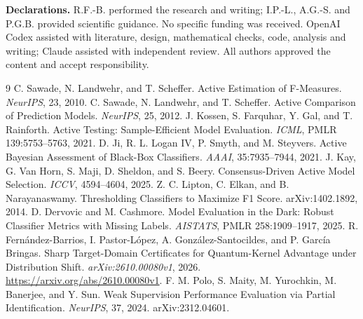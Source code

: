 \documentclass[a4paper]{esannV2}
\begin{document}
\noindent\textbf{Declarations.}
R.F.-B. performed the research and writing; I.P.-L., A.G.-S. and P.G.B.
provided scientific guidance. No specific funding was received. OpenAI Codex
assisted with literature, design, mathematical checks, code, analysis and
writing; Claude assisted with independent review. All authors approved the
content and accept responsibility.
\begin{footnotesize}
\begin{thebibliography}{9}
 C. Sawade, N. Landwehr, and T. Scheffer.
Active Estimation of F-Measures. \emph{NeurIPS}, 23, 2010.
 C. Sawade, N. Landwehr, and T. Scheffer.
Active Comparison of Prediction Models. \emph{NeurIPS}, 25, 2012.
 J. Kossen, S. Farquhar, Y. Gal, and T. Rainforth.
Active Testing: Sample-Efficient Model Evaluation. \emph{ICML}, PMLR 139:5753--5763, 2021.
 D. Ji, R. L. Logan IV, P. Smyth, and M. Steyvers.
Active Bayesian Assessment of Black-Box Classifiers. \emph{AAAI}, 35:7935--7944, 2021.
 J. Kay, G. Van Horn, S. Maji, D. Sheldon, and S. Beery.
Consensus-Driven Active Model Selection. \emph{ICCV}, 4594--4604, 2025.
 Z. C. Lipton, C. Elkan, and B. Narayanaswamy.
Thresholding Classifiers to Maximize F1 Score. arXiv:1402.1892, 2014.
 D. Dervovic and M. Cashmore.
Model Evaluation in the Dark: Robust Classifier Metrics with Missing Labels.
\emph{AISTATS}, PMLR 258:1909--1917, 2025.
 R. Fern\'andez-Barrios, I. Pastor-L\'opez, A. Gonz\'alez-Santocildes,
and P. Garc\'ia Bringas. Sharp Target-Domain Certificates for Quantum-Kernel
Advantage under Distribution Shift. \emph{arXiv:2610.00080v1}, 2026.
\url{https://arxiv.org/abs/2610.00080v1}. F. M. Polo, S. Maity, M. Yurochkin, M. Banerjee, and Y. Sun.
Weak Supervision Performance Evaluation via Partial Identification.
\emph{NeurIPS}, 37, 2024. arXiv:2312.04601.
\end{thebibliography}
\end{footnotesize}
\end{document}
